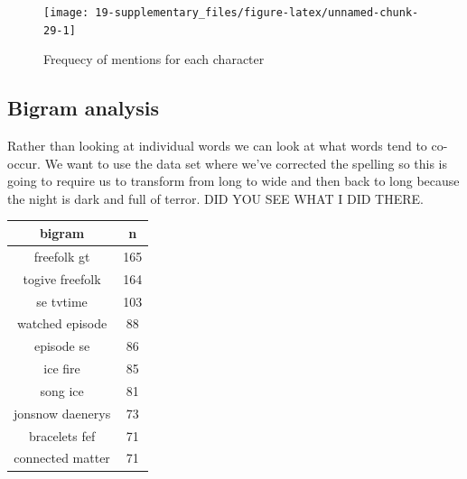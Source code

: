 \documentclass[]{book}
\newenvironment{Shaded}{\begin{snugshade}}{\end{snugshade}}
\newcommand{\CommentTok}[1]{\textcolor[rgb]{0.56,0.35,0.01}{\textit{#1}}}
\newcommand{\DataTypeTok}[1]{\textcolor[rgb]{0.13,0.29,0.53}{#1}}
\newcommand{\DecValTok}[1]{\textcolor[rgb]{0.00,0.00,0.81}{#1}}
\newcommand{\KeywordTok}[1]{\textcolor[rgb]{0.13,0.29,0.53}{\textbf{#1}}}
\newcommand{\NormalTok}[1]{#1}
\newcommand{\OperatorTok}[1]{\textcolor[rgb]{0.81,0.36,0.00}{\textbf{#1}}}
\newcommand{\OtherTok}[1]{\textcolor[rgb]{0.56,0.35,0.01}{#1}}
\newcommand{\StringTok}[1]{\textcolor[rgb]{0.31,0.60,0.02}{#1}}
\begin{document}
\begin{figure}

{\centering \texttt{[image: 19-supplementary\_files/figure-latex/unnamed-chunk-29-1]} 

}

\caption{Frequecy of mentions for each character}\label{fig:unnamed-chunk-29}
\end{figure}

\hypertarget{bigram-analysis}{%
\subsection{Bigram analysis}\label{bigram-analysis}}

Rather than looking at individual words we can look at what words tend to co-occur. We want to use the data set where we've corrected the spelling so this is going to require us to transform from long to wide and then back to long because the night is dark and full of terror. DID YOU SEE WHAT I DID THERE.

\begin{Shaded}
\end{Shaded}

\begin{tabular}{c|c}
\hline
bigram & n\\
\hline
freefolk gt & 165\\
\hline
togive freefolk & 164\\
\hline
se tvtime & 103\\
\hline
watched episode & 88\\
\hline
episode se & 86\\
\hline
ice fire & 85\\
\hline
song ice & 81\\
\hline
jonsnow daenerys & 73\\
\hline
bracelets fef & 71\\
\hline
connected matter & 71\\
\hline
\end{tabular}
\end{document}
